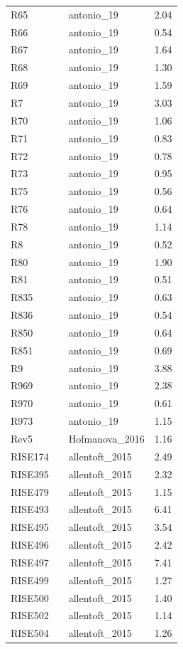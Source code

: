 \begin{longtable}[t]{lllr}
R65 &  & antonio\_19 & 2.04\\
R66 &  & antonio\_19 & 0.54\\
R67 &  & antonio\_19 & 1.64\\
R68 &  & antonio\_19 & 1.30\\
R69 &  & antonio\_19 & 1.59\\
R7 &  & antonio\_19 & 3.03\\
R70 &  & antonio\_19 & 1.06\\
R71 &  & antonio\_19 & 0.83\\
R72 &  & antonio\_19 & 0.78\\
R73 &  & antonio\_19 & 0.95\\
R75 &  & antonio\_19 & 0.56\\
R76 &  & antonio\_19 & 0.64\\
R78 &  & antonio\_19 & 1.14\\
R8 &  & antonio\_19 & 0.52\\
R80 &  & antonio\_19 & 1.90\\
R81 &  & antonio\_19 & 0.51\\
R835 &  & antonio\_19 & 0.63\\
R836 &  & antonio\_19 & 0.54\\
R850 &  & antonio\_19 & 0.64\\
R851 &  & antonio\_19 & 0.69\\
R9 &  & antonio\_19 & 3.88\\
R969 &  & antonio\_19 & 2.38\\
R970 &  & antonio\_19 & 0.61\\
R973 &  & antonio\_19 & 1.15\\
Rev5 &  & Hofmanova\_2016 & 1.16\\
RISE174 &  & allentoft\_2015 & 2.49\\
RISE395 &  & allentoft\_2015 & 2.32\\
RISE479 &  & allentoft\_2015 & 1.15\\
RISE493 &  & allentoft\_2015 & 6.41\\
RISE495 &  & allentoft\_2015 & 3.54\\
RISE496 &  & allentoft\_2015 & 2.42\\
RISE497 &  & allentoft\_2015 & 7.41\\
RISE499 &  & allentoft\_2015 & 1.27\\
RISE500 &  & allentoft\_2015 & 1.40\\
RISE502 &  & allentoft\_2015 & 1.14\\
RISE504 &  & allentoft\_2015 & 1.26\\

\end{longtable}
